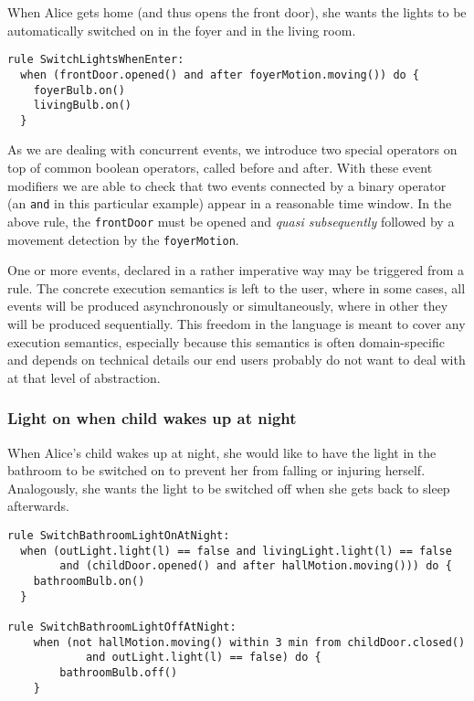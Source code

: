 When Alice gets home (and thus opens the front door), she wants the lights to be automatically switched on in the foyer and in the living room.

\begin{lstlisting}[language=iotdsl,label=lis:home-rule,caption=\IOTDSL business rule to switch on the lights when coming home]
rule SwitchLightsWhenEnter:
  when (frontDoor.opened() and after foyerMotion.moving()) do {
    foyerBulb.on()
    livingBulb.on()
  }
\end{lstlisting}

As we are dealing with concurrent events, we introduce two special operators on top of common boolean operators, called \textsf{before} and \textsf{after}. With these event modifiers we are able to check that two events connected by a binary operator (an \texttt{and} in this particular example) appear in a reasonable time window. In the above rule, the \texttt{frontDoor} must be opened and \textit{quasi subsequently} followed by a movement detection by the \texttt{foyerMotion}.

One or more events, declared in a rather imperative way may be triggered from a rule. The concrete execution semantics is left to the user, where in some cases, all events will be produced asynchronously or simultaneously, where in other they will be produced sequentially. This freedom in the language is meant to cover any execution semantics, especially because this semantics is often domain-specific and depends on technical details our end users probably do not want to deal with at that level of abstraction.

\subsubsection*{Light on when child wakes up at night}
	
When Alice's child wakes up at night, she would like to have the light in the bathroom to be switched on to prevent her from falling or injuring herself. Analogously, she wants the light to be switched off when she gets back to sleep afterwards.

\begin{lstlisting}[language=iotdsl,label=lis:night-rule,caption=\IOTDSL business rules to switch on\//off the lights at night]
rule SwitchBathroomLightOnAtNight:	
  when (outLight.light(l) == false and livingLight.light(l) == false 
  		and (childDoor.opened() and after hallMotion.moving())) do {
  	bathroomBulb.on()
  }
  
rule SwitchBathroomLightOffAtNight:	
	when (not hallMotion.moving() within 3 min from childDoor.closed() 
			and outLight.light(l) == false) do {
		bathroomBulb.off()
	}
\end{lstlisting}

